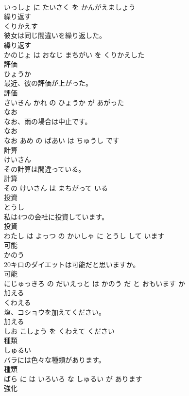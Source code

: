 \documentclass[8pt]{extreport}
\begin{document}
\begin{CJK}{UTF8}{min}
\\	いっしょ に たいさく を かんがえましょう			
\\	繰り返す	
\\	くりかえす			
\\	彼女は同じ間違いを繰り返した。	
\\	繰り返す 
\\	かのじょ は おなじ まちがい を くりかえした			
\\	評価	
\\	ひょうか			
\\	最近、彼の評価が上がった。	
\\	評価 
\\	さいきん かれ の ひょうか が あがった			
\\	なお	
\\	なお、雨の場合は中止です。	
\\	なお 
\\	なお あめ の ばあい は ちゅうし です			
\\	計算	
\\	けいさん			
\\	その計算は間違っている。	
\\	計算 
\\	その けいさん は まちがって いる			
\\	投資	
\\	とうし			
\\	私は4つの会社に投資しています。	
\\	投資 
\\	わたし は よっつ の かいしゃ に とうし して います			
\\	可能	
\\	かのう			
\\	20キロのダイエットは可能だと思いますか。	
\\	可能 
\\	にじゅっきろ の だいえっと は かのう だ と おもいます か			
\\	加える	
\\	くわえる			
\\	塩、コショウを加えてください。	
\\	加える 
\\	しお こしょう を くわえて ください			
\\	種類	
\\	しゅるい			
\\	バラには色々な種類があります。	
\\	種類 
\\	ばら に は いろいろ な しゅるい が あります			
\\	強化	

\end{CJK}
\end{document}
